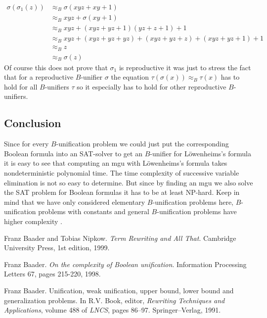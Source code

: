 	\begin{align*}
		\sigma(\sigma_1(z)) & \approx_B\sigma(xyz+xy+1)                        \\
		                    & \approx_Bxyz+\sigma(xy+1)                        \\
		                    & \approx_Bxyz+(xyz+yz+1)(yz+z+1)+1                \\
		                    & \approx_Bxyz+(xyz+yz+yz)+(xyz+yz+z)+(xyz+yz+1)+1 \\
		                    & \approx_Bz                                       \\
		                    & \approx_B\sigma(z)                               
	\end{align*}
	Of course this does not prove that $\sigma_1$ is reproductive it was just to stress the fact that for a reproductive $B$-unifier $\sigma$ the equation $\tau(\sigma(x))\approx_B\tau(x)$ has to hold for all $B$-unifiers $\tau$ so it especially has to hold for other reproductive $B$-unifiers.
	\subsection{Conclusion}
	Since for every $B$-unification problem we could just put the corresponding Boolean formula into an SAT-solver to get an $B$-unifier for Löwenheims's formula it is easy to see that computing an mgu with Löwenheims's formula takes nondeterministic polynomial time. The time complexity of successive variable elimination is not so easy to determine. But since by finding an mgu we also solve the SAT problem for Boolean formulas it has to be at least NP-hard. Keep in mind that we have only considered elementary $B$-unification problems here, $B$-unification problems with constants and general $B$-unification problems have higher complexity \cite{cmplxBU}.
	\begin{thebibliography}{9}
				
		Franz Baader and Tobias Nipkow.
		\emph{Term Rewriting and All That}.
		Cambridge University Press,
		1st edition,
		1999.
				
		Franz Baader.
		\emph{On the complexity of Boolean unification}.
		Information Processing Letters 67,
		pages 215-220,
		1998.
		
		Franz Baader.
		Unification, weak unification, upper bound, lower bound and generalization problems.
		In R.V. Book, editor,
		\emph{Rewriting Techniques and Applications},
		volume 488 of \emph{LNCS},
		pages 86–97. 
		Springer–Verlag,
		1991.
				
	\end{thebibliography}